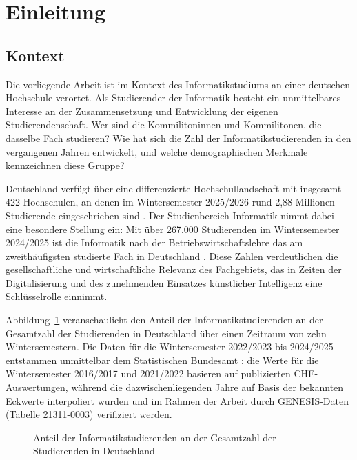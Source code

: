 \section{Einleitung}

\subsection{Kontext}

Die vorliegende Arbeit ist im Kontext des Informatikstudiums an einer deutschen Hochschule verortet. Als Studierender der Informatik besteht ein unmittelbares Interesse an der Zusammensetzung und Entwicklung der eigenen Studierendenschaft. Wer sind die Kommilitoninnen und Kommilitonen, die dasselbe Fach studieren? Wie hat sich die Zahl der Informatikstudierenden in den vergangenen Jahren entwickelt, und welche demographischen Merkmale kennzeichnen diese Gruppe?

Deutschland verfügt über eine differenzierte Hochschullandschaft mit insgesamt 422 Hochschulen, an denen im Wintersemester 2025/2026 rund 2,88 Millionen Studierende eingeschrieben sind \cite{hrkStatistik2025, destatisWS2025}. Der Studienbereich Informatik nimmt dabei eine besondere Stellung ein: Mit über 267.000 Studierenden im Wintersemester 2024/2025 ist die Informatik nach der Betriebswirtschaftslehre das am zweithäufigsten studierte Fach in Deutschland \cite{destatisStudierende2025}. Diese Zahlen verdeutlichen die gesellschaftliche und wirtschaftliche Relevanz des Fachgebiets, das in Zeiten der Digitalisierung und des zunehmenden Einsatzes künstlicher Intelligenz eine Schlüsselrolle einnimmt.

Abbildung~\ref{fig:informatik_anteil} veranschaulicht den Anteil der Informatikstudierenden an der Gesamtzahl der Studierenden in Deutschland über einen Zeitraum von zehn Wintersemestern. Die Daten für die Wintersemester 2022/2023 bis 2024/2025 entstammen unmittelbar dem Statistischen Bundesamt \cite{destatisStudierende2025}; die Werte für die Wintersemester 2016/2017 und 2021/2022 basieren auf publizierten CHE-Auswertungen, während die dazwischenliegenden Jahre auf Basis der bekannten Eckwerte interpoliert wurden und im Rahmen der Arbeit durch GENESIS-Daten (Tabelle 21311-0003) verifiziert werden.

\begin{figure}[ht]
    \centering
    
    \caption{Anteil der Informatikstudierenden an der Gesamtzahl der Studierenden in Deutschland}
    \label{fig:informatik_anteil}
\end{figure}

